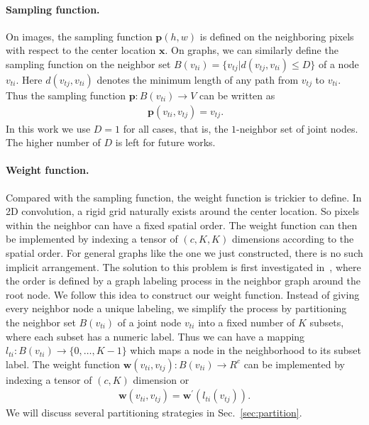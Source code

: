 \documentclass[letterpaper]{article} %
\begin{document}
\paragraph{Sampling function.}
On images, the sampling function $\mathbf{p}(h, w)$ is defined on the neighboring pixels with respect to the center location $ \mathbf{x}$.
On graphs, we can similarly define the sampling function on the neighbor set $ B(v_{ti})=\{v_{tj} | d(v_{tj}, v_{ti}) \leq D \} $ of a node $ v_{ti} $.
Here $ d(v_{tj}, v_{ti}) $ denotes the minimum length of any path from $v_{tj} $ to $ v_{ti} $.
Thus the sampling function $ \mathbf{p}:B(v_{ti})\rightarrow V $ can be written as
\begin{align}~\label{eq:sampling}
\mathbf{p}(v_{ti}, v_{tj}) = v_{tj}.
\end{align}
In this work we use $ D = 1 $ for all cases, that is, the $ 1 $-neighbor set of joint nodes.
The higher number of $ D $ is left for future works.

\paragraph{Weight function.}
Compared with the sampling function, the weight function is trickier to define.
In 2D convolution, a rigid grid naturally exists around the center location.
So pixels within the neighbor can have a fixed spatial order.
The weight function can then be implemented by indexing a tensor of $ (c, K, K) $ dimensions according to the spatial order.
For general graphs like the one we just constructed, there is no such implicit arrangement.
The solution to this problem is first investigated in~\cite{Niepert2016ICML}, where the order is defined by a graph labeling process in the neighbor graph around the root node.
We follow this idea to construct our weight function.
Instead of giving every neighbor node a unique labeling, we simplify the process by partitioning the neighbor set $B(v_{ti})$ of a joint node $ v_{ti} $ into a fixed number of $ K $ subsets, where each subset has a numeric label.
Thus we can have a mapping $ l_{ti}:B(v_{ti})\rightarrow \{0,\ldots,K-1\} $ which maps a node in the neighborhood to its subset label.
The weight function $ \mathbf{w}(v_{ti}, v_{tj}): B(v_{ti})\rightarrow R^c $ can be implemented by indexing a tensor of $ (c, K) $ dimension or
\begin{align}\label{eq:weight}
\mathbf{w}(v_{ti}, v_{tj}) = \mathbf{w}^\prime(l_{ti}(v_{tj})).
\end{align}
We will discuss several partitioning strategies in Sec.~\ref{sec:partition}.
\end{document}
